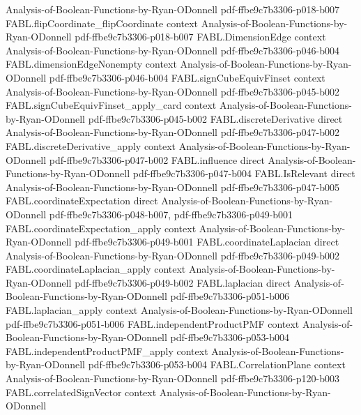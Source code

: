 \begin{theorem}
  {Analysis-of-Boolean-Functions-by-Ryan-ODonnell}
  {pdf-ffbe9c7b3306-p018-b007}
\proofstep
  {FABL.flipCoordinate_flipCoordinate}
  {context}
  {Analysis-of-Boolean-Functions-by-Ryan-ODonnell}
  {pdf-ffbe9c7b3306-p018-b007}
\proofstep
  {FABL.DimensionEdge}
  {context}
  {Analysis-of-Boolean-Functions-by-Ryan-ODonnell}
  {pdf-ffbe9c7b3306-p046-b004}
\proofstep
  {FABL.dimensionEdgeNonempty}
  {context}
  {Analysis-of-Boolean-Functions-by-Ryan-ODonnell}
  {pdf-ffbe9c7b3306-p046-b004}
\proofstep
  {FABL.signCubeEquivFinset}
  {context}
  {Analysis-of-Boolean-Functions-by-Ryan-ODonnell}
  {pdf-ffbe9c7b3306-p045-b002}
\proofstep
  {FABL.signCubeEquivFinset_apply_card}
  {context}
  {Analysis-of-Boolean-Functions-by-Ryan-ODonnell}
  {pdf-ffbe9c7b3306-p045-b002}
\proofstep
  {FABL.discreteDerivative}
  {direct}
  {Analysis-of-Boolean-Functions-by-Ryan-ODonnell}
  {pdf-ffbe9c7b3306-p047-b002}
\proofstep
  {FABL.discreteDerivative_apply}
  {context}
  {Analysis-of-Boolean-Functions-by-Ryan-ODonnell}
  {pdf-ffbe9c7b3306-p047-b002}
\proofstep
  {FABL.influence}
  {direct}
  {Analysis-of-Boolean-Functions-by-Ryan-ODonnell}
  {pdf-ffbe9c7b3306-p047-b004}
\proofstep
  {FABL.IsRelevant}
  {direct}
  {Analysis-of-Boolean-Functions-by-Ryan-ODonnell}
  {pdf-ffbe9c7b3306-p047-b005}
\proofstep
  {FABL.coordinateExpectation}
  {direct}
  {Analysis-of-Boolean-Functions-by-Ryan-ODonnell}
  {pdf-ffbe9c7b3306-p048-b007,
    pdf-ffbe9c7b3306-p049-b001}
\proofstep
  {FABL.coordinateExpectation_apply}
  {context}
  {Analysis-of-Boolean-Functions-by-Ryan-ODonnell}
  {pdf-ffbe9c7b3306-p049-b001}
\proofstep
  {FABL.coordinateLaplacian}
  {direct}
  {Analysis-of-Boolean-Functions-by-Ryan-ODonnell}
  {pdf-ffbe9c7b3306-p049-b002}
\proofstep
  {FABL.coordinateLaplacian_apply}
  {context}
  {Analysis-of-Boolean-Functions-by-Ryan-ODonnell}
  {pdf-ffbe9c7b3306-p049-b002}
\proofstep
  {FABL.laplacian}
  {direct}
  {Analysis-of-Boolean-Functions-by-Ryan-ODonnell}
  {pdf-ffbe9c7b3306-p051-b006}
\proofstep
  {FABL.laplacian_apply}
  {context}
  {Analysis-of-Boolean-Functions-by-Ryan-ODonnell}
  {pdf-ffbe9c7b3306-p051-b006}
\proofstep
  {FABL.independentProductPMF}
  {context}
  {Analysis-of-Boolean-Functions-by-Ryan-ODonnell}
  {pdf-ffbe9c7b3306-p053-b004}
\proofstep
  {FABL.independentProductPMF_apply}
  {context}
  {Analysis-of-Boolean-Functions-by-Ryan-ODonnell}
  {pdf-ffbe9c7b3306-p053-b004}
\proofstep
  {FABL.CorrelationPlane}
  {context}
  {Analysis-of-Boolean-Functions-by-Ryan-ODonnell}
  {pdf-ffbe9c7b3306-p120-b003}
\proofstep
  {FABL.correlatedSignVector}
  {context}
  {Analysis-of-Boolean-Functions-by-Ryan-ODonnell}

\end{theorem}
